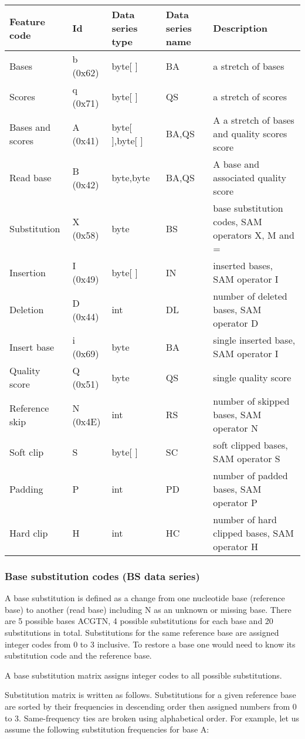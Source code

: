 \documentclass[a4paper]{article}
\begin{document}
\begin{tabular}{|>{\raggedright}p{91pt}|>{\raggedright}p{45pt}|>{\raggedright}p{72pt}|>{\raggedright}p{66pt}|>{\raggedright}p{132pt}|}
\hline
\textbf{Feature code} & \textbf{Id} & \textbf{Data series type} & \textbf{Data 
series name} & \textbf{Description}\tabularnewline
\hline
Bases & b (0x62) & byte[ ] & BA & a stretch of bases\tabularnewline
\hline
Scores & q (0x71) & byte[ ] & QS & a stretch of scores\tabularnewline
\hline
Bases and scores & A (0x41) & byte[ ],byte[ ] & BA,QS & A a stretch of bases and
quality scores score\tabularnewline
\hline
Read base & B (0x42) & byte,byte & BA,QS & A base and associated quality score\tabularnewline
\hline
Substitution & X (0x58) & byte & BS & base substitution codes, SAM operators X, 
M and =\tabularnewline
\hline
Insertion & I (0x49) & byte[ ] & IN & inserted bases, SAM operator I\tabularnewline
\hline
Deletion & D (0x44) & int & DL & number of deleted bases, SAM operator D\tabularnewline
\hline
Insert base & i (0x69) & byte & BA & single inserted base, SAM operator I\tabularnewline
\hline
Quality score & Q (0x51) & byte & QS & single quality score\tabularnewline
\hline
Reference skip & N (0x4E) & int & RS & number of skipped bases, SAM operator N\tabularnewline
\hline
Soft clip & S & byte[ ] & SC & soft clipped bases, SAM operator S\tabularnewline
\hline
Padding & P & int & PD & number of padded bases, SAM operator P\tabularnewline
\hline
Hard clip & H & int & HC & number of hard clipped bases, SAM operator H\tabularnewline
\hline
\end{tabular}

\subsubsection*{Base substitution codes (BS data series)}

A base substitution is defined as a change from one nucleotide base (reference 
base) to another (read base) including N as an unknown or missing base. There are 
5 possible bases ACGTN, 4 possible substitutions for each base and 20 substitutions 
in total. Substitutions for the same reference base are assigned integer codes 
from 0 to 3 inclusive. To restore a base one would need to know its substitution 
code and the reference base. 

A base substitution matrix assigns integer codes to all possible substitutions. 

Substitution matrix is written as follows. Substitutions for a given reference 
base are sorted by their frequencies in descending order then assigned numbers 
from 0 to 3. Same-frequency ties are broken using alphabetical order. For example, 
let us assume the following substitution frequencies for base A: 
\end{document}
